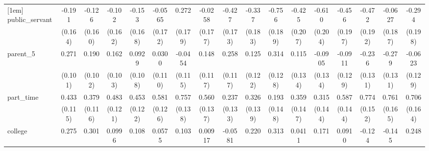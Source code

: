{\begin{tabular}{l*{16}{c}}
[1em]
public\_servant      &      -0.191         &      -0.126         &      -0.102         &      -0.153         &     -0.0565         &       0.272         &     -0.0258         &      -0.427\sym{*}  &      -0.337         &      -0.756\sym{***}&      -0.425\sym{*}  &      -0.610\sym{**} &      -0.456\sym{*}  &      -0.472\sym{*}  &     -0.0627         &      -0.294         \\
                    &     (0.164)         &     (0.160)         &     (0.162)         &     (0.168)         &     (0.172)         &     (0.179)         &     (0.177)         &     (0.173)         &     (0.183)         &     (0.189)         &     (0.207)         &     (0.204)         &     (0.197)         &     (0.192)         &     (0.187)         &     (0.198)         \\
[1em]
parent\_5            &       0.271\sym{**} &       0.190         &       0.162         &      0.0929         &      0.0300         &     -0.0454         &       0.148         &       0.258\sym{*}  &       0.125         &       0.314\sym{*}  &       0.115         &     -0.0905         &     -0.0911         &      -0.236         &      -0.279\sym{*}  &     -0.0623         \\
                    &     (0.101)         &     (0.102)         &     (0.103)         &     (0.108)         &     (0.110)         &     (0.115)         &     (0.117)         &     (0.117)         &     (0.122)         &     (0.128)         &     (0.134)         &     (0.134)         &     (0.129)         &     (0.131)         &     (0.131)         &     (0.129)         \\
[1em]
part\_time           &       0.433\sym{***}&       0.379\sym{**} &       0.483\sym{***}&       0.453\sym{***}&       0.581\sym{***}&       0.757\sym{***}&       0.560\sym{***}&       0.237         &       0.326\sym{*}  &       0.193         &       0.359\sym{*}  &       0.315\sym{*}  &       0.587\sym{***}&       0.774\sym{***}&       0.761\sym{***}&       0.706\sym{***}\\
                    &     (0.115)         &     (0.116)         &     (0.121)         &     (0.122)         &     (0.126)         &     (0.138)         &     (0.137)         &     (0.133)         &     (0.139)         &     (0.148)         &     (0.147)         &     (0.144)         &     (0.144)         &     (0.152)         &     (0.165)         &     (0.164)         \\
[1em]
college             &       0.275\sym{*}  &       0.301\sym{*}  &      0.0996         &       0.108         &      0.0575         &       0.103         &     0.00917         &     -0.0581         &       0.220         &       0.313         &      0.0411         &       0.171         &      0.0910         &      -0.124         &      -0.145         &       0.248         \\

\end{tabular}}
